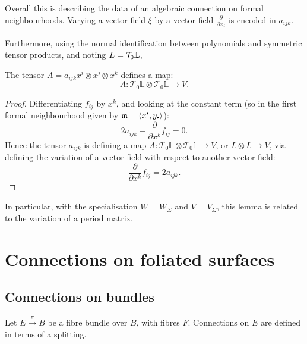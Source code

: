     Overall this is describing the data of an algebraic connection on formal neighbourhoods. Varying a vector field \( \xi\) by a vector field \( \frac{\partial}{\partial x_j}\) is encoded in \(a_{ijk}\).
    
    Furthermore, using the normal identification between polynomials and symmetric tensor products, and noting \( L = \mathcal{T}_0 \mathbb{L} \),
    \begin{lem} The tensor \(A = a_{ijk} x^i \otimes x^j \otimes x^k\) defines a map:
    \[ A : \mathcal{T}_0 \mathbb{L} \otimes \mathcal{T}_0 \mathbb{L}\to V.\]
    \end{lem}
    
    \begin{proof}
    Differentiating \(f_{ij}\) by \(x^k\), and looking at the constant term (so in the first formal neighbourhood given by \( \mathfrak{m} = \langle x^{\sbt},y_{\sbt}\rangle\)):
    \[ 2a_{ijk}-\frac{\partial}{\partial x^k}f_{ij}=0.\]
    Hence the tensor \(a_{ijk}\) is defining a map \(A : \mathcal{T}_0 \mathbb{L} \otimes \mathcal{T}_0 \mathbb{L}\to V \), or \( L \otimes L \rightarrow V\), via
    defining the variation of a vector field with respect to another vector field:
    \[ \frac{\partial}{\partial x^k}f_{ij} = 2 a_{ijk}. \]
    \end{proof}
        
    In particular, with the specialisation \(W= W_\Sigma\) and \(V=V_\Sigma\), this lemma is related to the variation of a period matrix. 


    \section{Connections on foliated surfaces}    
    
    \subsection{Connections on bundles} 
    
    Let \( E \stackrel{\pi}{\rightarrow} B\) be a fibre bundle over \(B\), with fibres \(F\). Connections on \(E\) are defined in terms of a splitting. 
    
    
    \iffalse 
    \begin{defn}[Connection]
    A \emph{connection} \( \nabla\), on a bundle \(E\), is a linear map 
    \[ \nabla : \Gamma(E) \rightarrow \Omega^1(E,B), \]
    which for a section \(s\), and function \(f\) on \(B\), satisfies Leibniz rule:
    \[ \nabla(f s) = d f \otimes s + f \nabla s. \] 
    \end{defn}
    \fi 
    
